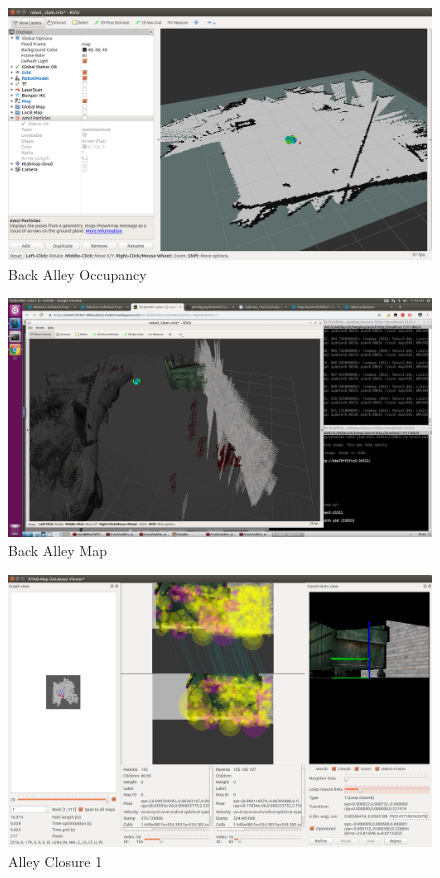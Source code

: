 \documentclass[10pt,journal,compsoc]{IEEEtran}
\begin{document}
\begin{figure}
    \centering
    \includegraphics[width=\linewidth]{alley_occupancy}
    \caption{Back Alley Occupancy}
    \label{fig:alley_2d}
\end{figure}

\begin{figure}
    \centering
    \includegraphics[width=\linewidth]{alley_confused}
    \caption{Back Alley Map}
    \label{fig:alley_3d}
\end{figure}

\begin{figure}
    \centering
    \includegraphics[width=\linewidth]{alley_closure_1}
    \caption{Alley Closure 1}
    \label{fig:alley_closure_1}
\end{figure}
\end{document}
